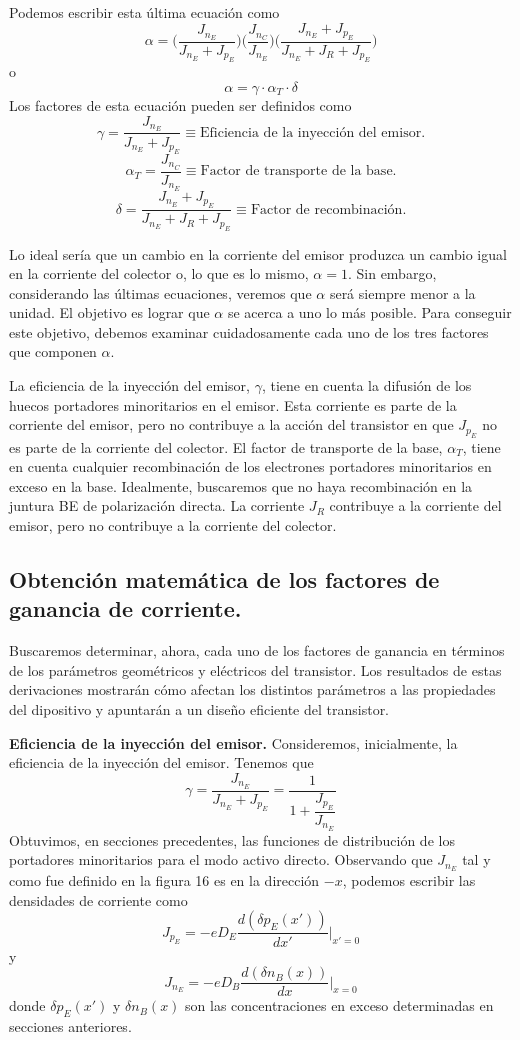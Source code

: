 \documentclass[12pt,a4paper]{article}
\begin{document}
Podemos escribir esta última ecuación como
\[ \alpha = \bigg( \frac{J_{n_{E}}}{J_{n_{E}}+J_{p_{E}}} \bigg) \bigg( \frac{J_{n_{C}}}{J_{n_{E}}} \bigg) \bigg( \frac{J_{n_{E}}+J_{p_{E}}}{J_{n_{E}}+J_{R}+J_{p_{E}}} \bigg) \]
o
\[ \alpha = \gamma \cdot  \alpha _{T} \cdot \delta \]
Los factores de esta ecuación pueden ser definidos como
\[ \gamma = \frac{J_{n_{E}}}{J_{n_{E}}+J_{p_{E}}} \equiv \textrm{Eficiencia de la inyección del emisor.} \]
\[ \alpha _{T}=\frac{J_{n_{C}}}{J_{n_{E}}} \equiv \textrm{Factor de transporte de la base.} \]
\[ \delta = \frac{J_{n_{E}}+J_{p_{E}}}{J_{n_{E}}+J_{R}+J_{p_{E}}} \equiv \textrm{Factor de recombinación.} \]

Lo ideal sería que un cambio en la corriente del emisor produzca un cambio igual en la corriente del colector o, lo que es lo mismo, $\alpha=1$. Sin embargo, considerando las últimas ecuaciones, veremos que $\alpha$ será siempre menor a la unidad. El objetivo es lograr que $\alpha$ se acerca a uno lo más posible. Para conseguir este objetivo, debemos examinar cuidadosamente cada uno de los tres factores que componen $\alpha$.

La eficiencia de la inyección del emisor, $\gamma$, tiene en cuenta la difusión de los huecos portadores minoritarios en el emisor. Esta corriente es parte de la corriente del emisor, pero no contribuye a la acción del transistor en que $J_{p_{E}}$ no es parte de la corriente del colector. El factor de transporte de la base, $\alpha _{T}$, tiene en cuenta cualquier recombinación de los electrones portadores minoritarios en exceso en la base. Idealmente, buscaremos que no haya recombinación en la juntura BE de polarización directa. La corriente $J_{R}$ contribuye a la corriente del emisor, pero no contribuye a la corriente del colector.

\subsection{Obtención matemática de los factores de ganancia de corriente.}

Buscaremos determinar, ahora, cada uno de los factores de ganancia en términos de los parámetros geométricos y eléctricos del transistor. Los resultados de estas derivaciones mostrarán cómo afectan los distintos parámetros a las propiedades del dipositivo y apuntarán a un diseño eficiente del transistor.

\textbf{Eficiencia de la inyección del emisor.} Consideremos, inicialmente, la eficiencia de la inyección del emisor. Tenemos que
\[ \gamma = \frac{J_{n_{E}}}{J_{n_{E}}+J_{p_{E}}}=\frac{1}{1+\dfrac{J_{p_{E}}}{J_{n_{E}}}} \]
Obtuvimos, en secciones precedentes, las funciones de distribución de los portadores minoritarios para el modo activo directo. Observando que $J_{n_{E}}$ tal y como fue definido en la figura 16 es en la dirección $-x$, podemos escribir las densidades de corriente como
\[ J_{p_{E}}=-eD_{E}\frac{d(\delta p_{E}(x'))}{dx'} |_{x'=0} \]
y
\[ J_{n_{E}}=-eD_{B} \frac{d (\delta n_{B}(x))}{dx} |_{x=0} \]
donde $\delta p_{E}(x')$ y $\delta n_{B}(x)$ son las concentraciones en exceso determinadas en secciones anteriores.
\end{document}
